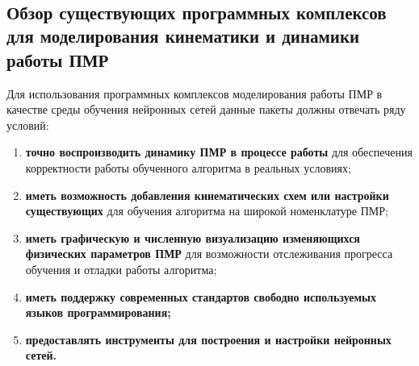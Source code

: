 ~

\subsection{\textbf{Обзор существующих программных комплексов для моделирования кинематики и динамики работы ПМР}}

Для использования программных комплексов моделирования работы ПМР в качестве среды обучения нейронных сетей данные пакеты должны отвечать ряду условий:
\begin{enumerate}[label=\arabic*)]
    \item \textbf{точно воспроизводить динамику ПМР в процессе работы} для обеспечения корректности работы обученного алгоритма в реальных условиях;
    \item \textbf{иметь возможность добавления кинематических схем или настройки существующих} для обучения алгоритма на широкой номенклатуре ПМР;
    \item \textbf{иметь графическую и численную визуализацию изменяющихся физических параметров ПМР} для возможности отслеживания прогресса обучения и отладки работы алгоритма;
    \item \textbf{иметь поддержку современных стандартов свободно используемых языков программирования;}
    \item \textbf{предоставлять инструменты для построения и настройки нейронных сетей.}
\end{enumerate}

